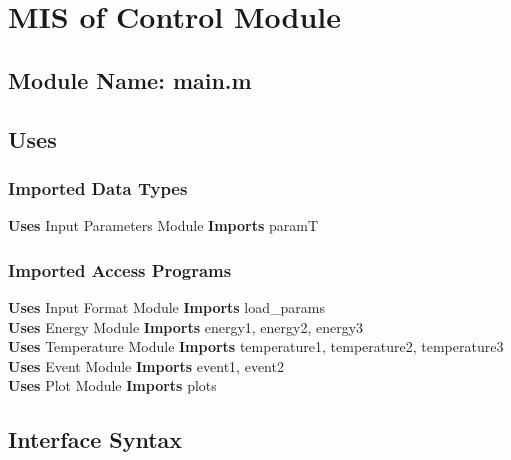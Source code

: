\documentclass[12pt]{article}
\begin{document}
\section{MIS of Control Module}

\subsection{Module Name: main.m}

\subsection{Uses}



\subsubsection{Imported Data Types}
\textbf{Uses} Input Parameters Module \textbf{Imports} paramT 

\subsubsection{Imported Access Programs}
\textbf{Uses} Input Format Module \textbf{Imports} load\_{params} \\
\textbf{Uses} Energy Module \textbf{Imports} energy1, energy2, energy3 \\
\textbf{Uses} Temperature Module \textbf{Imports} 
temperature1, temperature2, temperature3 \\
\textbf{Uses} Event Module \textbf{Imports} event1, event2 \\
\textbf{Uses} Plot Module \textbf{Imports} plots \\


\subsection{Interface Syntax}


\end{document}
